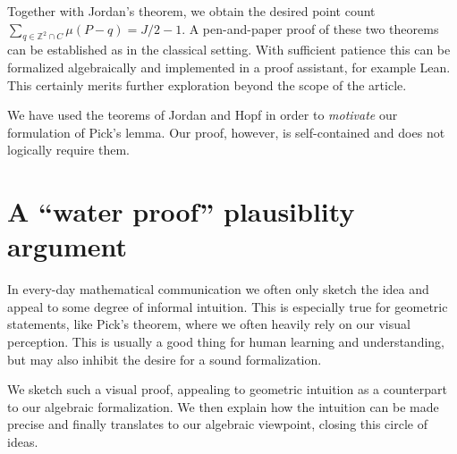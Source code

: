 \documentclass[a4paper]{amsart}
\numberwithin{equation}{section}
\theoremstyle{plain}
\theoremstyle{definition}
\newcommand{\Z}{\mathbb{Z}}
\begin{document}
Together with Jordan's theorem, we obtain the desired
point count $\sum_{q \in \Z^2 \cap C} \mu(P-q) = J/2 - 1$.
%
A pen-and-paper proof of these two theorems
can be established as in the classical setting.
With sufficient patience this can be formalized algebraically
and implemented in a proof assistant, for example Lean.
This certainly merits further exploration beyond the scope of the article.

We have used the teorems of Jordan and Hopf in order
to \emph{motivate} our formulation of Pick's lemma.
Our proof, however, is self-contained and
does not logically require them.


\section{A ``water proof'' plausiblity argument}

In every-day mathematical communication we often only sketch
the idea and appeal to some degree of informal intuition.
This is especially true for geometric statements,
like Pick's theorem, where we often heavily rely on our visual perception.
This is usually a good thing for human learning and understanding,
but may also inhibit the desire for a sound formalization.

We sketch such a visual proof, appealing to geometric intuition
as a counterpart to our algebraic formalization.
We then explain how the intuition can be made precise
and finally translates to our algebraic viewpoint,
closing this circle of ideas.
\end{document}

